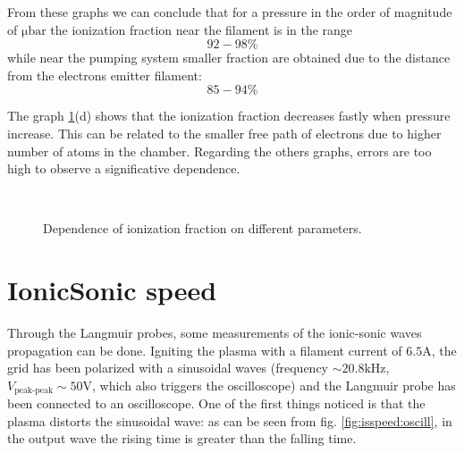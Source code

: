 \documentclass[11pt,a4 paper]{article}
\begin{document}
From these graphs we can conclude that for a pressure in the order of magnitude of $\si{\micro\bar}$ the ionization fraction near the filament is in the range
\[92-98\%\]
while near the pumping system smaller fraction are obtained due to the distance from the electrons emitter filament:
\[85-94\%\]

The graph \ref{fig:f}(d) shows that the ionization fraction decreases fastly when pressure increase. This can be related to the smaller free path of electrons due to higher number of atoms in the chamber. Regarding the others graphs, errors are too high to observe a significative dependence.
%
\begin{figure}[H]
\\%
 \caption{Dependence of ionization fraction on different parameters.}\label{fig:f}%
\end{figure}

\section{IonicSonic speed}
Through the Langmuir probes, some measurements of the ionic-sonic waves propagation can be done. Igniting the plasma with a filament current of $6.5\si{\ampere}$, the grid has been polarized with a sinusoidal waves (frequency $\sim20.8\si{\kilo\hertz}$, $V_\text{peak-peak}\sim50\si{\volt}$, which also triggers the oscilloscope) and the Langmuir probe has been connected to an oscilloscope. One of the first things noticed is that the plasma distorts the sinusoidal wave: as can be seen from fig. \ref{fig:isspeed:oscill}, in the output wave the rising time is greater than the falling time.
\end{document}
